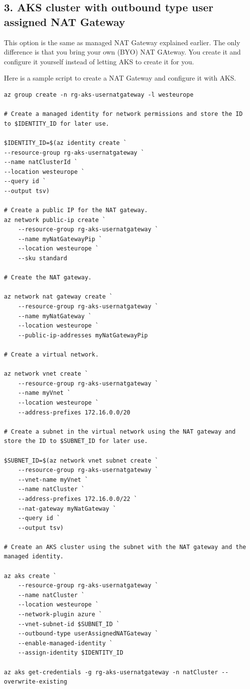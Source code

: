 \documentclass[
]{article}
\begin{document}
\hypertarget{aks-cluster-with-outbound-type-user-assigned-nat-gateway}{%
\subsection{3. AKS cluster with outbound type user assigned NAT
Gateway}\label{aks-cluster-with-outbound-type-user-assigned-nat-gateway}}

This option is the same as managed NAT Gateway explained earlier. The
only difference is that you bring your own (BYO) NAT GAteway. You create
it and configure it yourself instead of letting AKS to create it for
you.

Here is a sample script to create a NAT Gateway and configure it with
AKS.

\begin{lstlisting}
az group create -n rg-aks-usernatgateway -l westeurope

# Create a managed identity for network permissions and store the ID to $IDENTITY_ID for later use.

$IDENTITY_ID=$(az identity create `
--resource-group rg-aks-usernatgateway `
--name natClusterId `
--location westeurope `
--query id `
--output tsv)

# Create a public IP for the NAT gateway.
az network public-ip create `
    --resource-group rg-aks-usernatgateway `
    --name myNatGatewayPip `
    --location westeurope `
    --sku standard

# Create the NAT gateway.

az network nat gateway create `
    --resource-group rg-aks-usernatgateway `
    --name myNatGateway `
    --location westeurope `
    --public-ip-addresses myNatGatewayPip

# Create a virtual network.

az network vnet create `
    --resource-group rg-aks-usernatgateway `
    --name myVnet `
    --location westeurope `
    --address-prefixes 172.16.0.0/20 

# Create a subnet in the virtual network using the NAT gateway and store the ID to $SUBNET_ID for later use.

$SUBNET_ID=$(az network vnet subnet create `
    --resource-group rg-aks-usernatgateway `
    --vnet-name myVnet `
    --name natCluster `
    --address-prefixes 172.16.0.0/22 `
    --nat-gateway myNatGateway `
    --query id `
    --output tsv)

# Create an AKS cluster using the subnet with the NAT gateway and the managed identity.

az aks create `
    --resource-group rg-aks-usernatgateway `
    --name natCluster `
    --location westeurope `
    --network-plugin azure `
    --vnet-subnet-id $SUBNET_ID `
    --outbound-type userAssignedNATGateway `
    --enable-managed-identity `
    --assign-identity $IDENTITY_ID

az aks get-credentials -g rg-aks-usernatgateway -n natCluster --overwrite-existing
\end{lstlisting}
\end{document}
